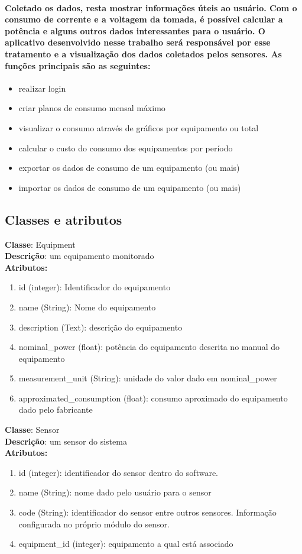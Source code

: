 \paragraph{
Coletado os dados, resta mostrar informações úteis ao usuário. Com o consumo de corrente e a voltagem da tomada, é possível calcular a potência e alguns outros dados interessantes para o usuário. O aplicativo desenvolvido nesse trabalho será responsável por esse tratamento e a visualização dos dados coletados pelos sensores. As funções principais são as seguintes:
}
\begin{itemize}
\item{realizar login}
\item{criar planos de consumo mensal máximo}
\item{visualizar o consumo através de gráficos por equipamento ou total}
\item{calcular o custo do consumo dos equipamentos por período}
\item{exportar os dados de consumo de um equipamento (ou mais)}
\item{importar os dados de consumo de um equipamento (ou mais)}
\end{itemize}
\subsection{Classes e atributos}
\textbf{Classe}: Equipment\\
\textbf{Descrição}: um equipamento monitorado\\	
\textbf{Atributos:}
\begin{enumerate}
  \item id (integer): Identificador do equipamento
  \item name (String): Nome do equipamento
  \item description (Text): descrição do equipamento 
  \item nominal\_power (float): potência do equipamento descrita no manual do equipamento 
  \item measurement\_unit (String): unidade do valor dado em nominal\_power
  \item approximated\_consumption (float): consumo aproximado do equipamento dado pelo fabricante 
\end{enumerate}

\textbf{Classe}: Sensor\\
\textbf{Descrição}: um sensor do sistema\\	
\textbf{Atributos:}
\begin{enumerate}
	\item id (integer): identificador do sensor dentro do software.
	\item name (String): nome dado pelo usuário para o sensor
	\item code (String): identificador do sensor entre outros sensores. Informação configurada no próprio módulo do sensor.
	\item equipment\_id (integer): equipamento a qual está associado
\end{enumerate}

